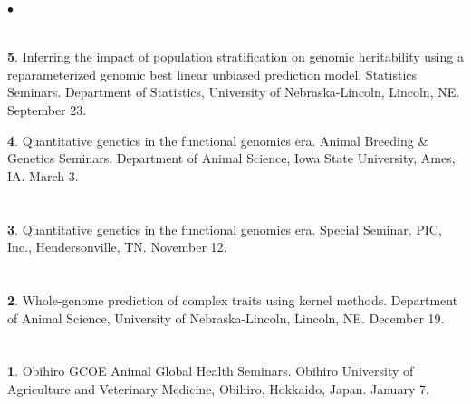 \documentclass[margin,line,10pt]{res}
\newenvironment{list1}{
  \begin{list}{\ding{113}}{%
      \setlength{\itemsep}{0in}
      \setlength{\parsep}{0in} \setlength{\parskip}{0in}
      \setlength{\topsep}{0in} \setlength{\partopsep}{0in} 
      \setlength{\leftmargin}{0.17in}}}{\end{list}}
\newenvironment{list2}{
  \begin{list}{$\bullet$}{%
      \setlength{\itemsep}{0in}
      \setlength{\parsep}{0in} \setlength{\parskip}{0in}
      \setlength{\topsep}{0in} \setlength{\partopsep}{0in} 
      \setlength{\leftmargin}{0.2in}}}{\end{list}}
\begin{document}
\begin{resume}
\begin{list2}
\end{list2}

\section{}
\begin{list1}
\item [{\bf 5}.] Inferring the impact of population stratification on genomic heritability using a reparameterized genomic best linear unbiased prediction model. Statistics Seminars. Department of Statistics, University of Nebraska-Lincoln, Lincoln, NE. September 23. 

  \vspace{0.5cm}

\item [{\bf 4}.] Quantitative genetics in the functional genomics era. Animal Breeding \& Genetics Seminars. Department of Animal Science, Iowa State University, Ames, IA. March 3. 
\end{list1}

\section{}
\begin{list1}
\item [{\bf 3}.] Quantitative genetics in the functional genomics era. Special Seminar. PIC, Inc., Hendersonville, TN.  November 12. 
\end{list1}

\section{}
\begin{list1}
\item [{\bf 2}.] Whole-genome prediction of complex traits using kernel methods. Department of Animal Science, University of Nebraska-Lincoln, Lincoln, NE. December 19. 
\end{list1}

\section{}
\begin{list1}
\item [{\bf 1}.] Obihiro GCOE Animal Global Health Seminars.  Obihiro University of Agriculture and  Veterinary Medicine, Obihiro, Hokkaido, Japan. January 7. 
\end{list1}  




\end{resume}
\end{document}
